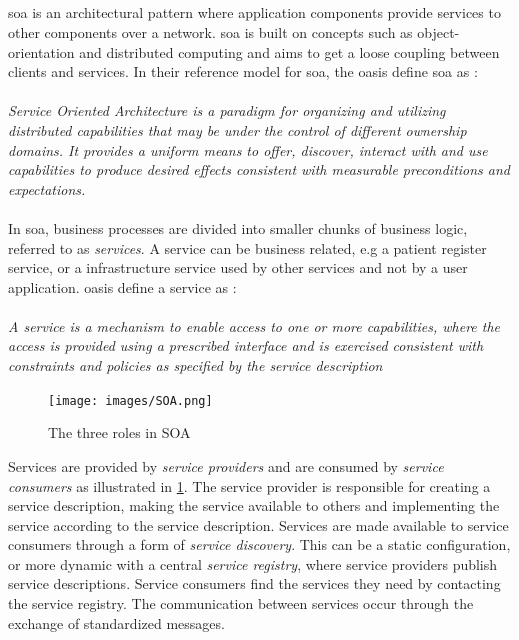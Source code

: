 \subsection{}
\gls{soa} is an architectural pattern where application components
provide services to other components over a network. \gls{soa} is built on
concepts such as object-orientation and distributed computing and aims to get
a loose coupling between clients and services. In their reference model for
\gls{soa}, the \gls{oasis} define \gls{soa} as \cite{oasis-soa-reference-model}:

\paragraph{}

\textit{Service Oriented Architecture is a paradigm for organizing and utilizing
distributed capabilities that may be under the control of different ownership
domains. It provides a uniform means to offer, discover, interact with and use
capabilities to produce desired effects consistent with measurable preconditions
and expectations.}

\paragraph{}

In \gls{soa}, business processes are divided into smaller chunks of business
logic, referred to as \textit{services}. A service can be business related, e.g
a patient register service, or a infrastructure service used by other services
and not by a user application. \gls{oasis} define a service as
\cite{oasis-soa-reference-model}:

\paragraph{}
\textit{
A service is a mechanism to enable access to one or more capabilities, where the
access is  provided using a prescribed interface and is exercised consistent
with constraints and policies as  specified by the service description
}

\begin{figure}[h]
\texttt{[image: images/SOA.png]}
\caption{The three roles in SOA}
\label{figure-soa-roles}
\end{figure}

Services are provided by \textit{service providers} and are consumed by
\textit{service consumers} as illustrated in \cref{figure-soa-roles}. The
service provider is responsible for creating a service description, making the
service available to others and implementing the service according to the
service description. Services are made available to service consumers through a
form of \textit{service discovery}. This can be a static configuration, or more
dynamic with a central \textit{service registry}, where service providers
publish service descriptions. Service consumers find the services they need by
contacting the service registry. The communication between services occur
through the exchange of standardized messages.

